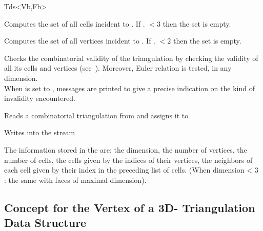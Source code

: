 \begin{ccClassTemplate}{Tds<Vb,Fb>}


{Computes the set  of all cells incident to . If
\ccVar. $<3$ then the set is empty.
}

{Computes the set  of all vertices incident to . If
\ccVar. $<2$ then the set is empty.
}

\begin{ccAdvanced}

{Checks the combinatorial validity of the triangulation by checking the
validity of all its cells and vertices (see~\pageref{TDS3-sec-Valid}). Moreover, Euler relation is tested, in
any dimension.\\ 
When  is set to , messages are printed to give
a precise indication on the kind of invalidity encountered.}
\end{ccAdvanced}


{Reads a combinatorial triangulation from  and assigns it to }

{Writes  into the stream }

The information stored in the  are: 
the dimension, the number of vertices, the number of cells,
the cells given by the indices of their vertices, the neighbors of
each cell given by their index in the preceding list of cells.
(When dimension < 3 : the same with faces of maximal dimension).

	\end{ccClassTemplate} 

	\subsection{Concept for the Vertex of a 3D- Triangulation Data Structure} 
	\label{TDS3-sec-concept-Tds_Vertex}


